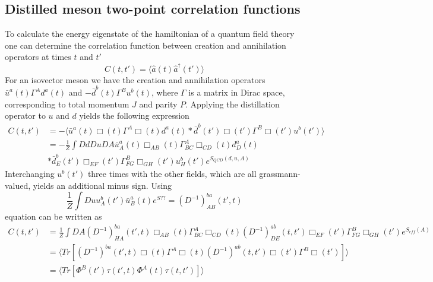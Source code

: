 \subsection{Distilled meson two-point correlation functions}
    To calculate the energy eigenstate of the hamiltonian of a quantum field theory one can determine the correlation function between creation and annihilation operators at times $t$ and $t'$
    \begin{equation}
        C(t,t') = \langle \hat{a}(t) \hat{a}^\dagger(t')\rangle
    \end{equation}
    For an isovector meson we have the creation and annihilation operators $\bar{u}^a(t)\Gamma^Ad^a(t)$ and $-\bar{d}^b(t)\Gamma^Bu^b(t)$, where $\Gamma$ is a matrix in Dirac space, corresponding to total momentum $J$ and parity $P$.
    Applying the distillation operator to $u$ and $d$ yields the following expression
    \begin{equation}\label{distillation_correlation}
        \begin{aligned}
            C(t,t') &= -\langle \bar{u}^a(t)\Box(t)\Gamma^A\Box(t)d^a(t) * \bar{d}^b(t')\Box(t')\Gamma^B\Box(t')u^b(t') \rangle\\
            &= -\frac{1}{Z}\int Dd Du DA \bar{u}_A^a(t)\Box_{AB}(t)\Gamma_{BC}^A\Box_{CD}(t)d_D^a(t)\\ &* \bar{d}_E^b(t')\Box_{EF}(t')\Gamma_{FG}^B\Box_{GH}(t')u_H^b(t') e^{S_{QCD}(d,u,A)}
        \end{aligned}
    \end{equation}
    Interchanging $u^b(t')$ three times with the other fields, which are all grassmann-valued, yields an additional minus sign. Using
    \begin{equation}
        \frac{1}{Z}\int Du u_A^b(t')\bar{u}_B^a(t)e^{S??} = (D^{-1})_{AB}^{ba}(t',t)
    \end{equation}
    equation  can be written as
    \begin{equation}
        \begin{aligned}
            C(t,t') &= \frac{1}{Z}\int DA (D^{-1})_{HA}^{ba}(t',t) \Box_{AB}(t)\Gamma_{BC}^A\Box_{CD}(t) (D^{-1})_{DE}^{ab}(t,t') \Box_{EF}(t')\Gamma_{FG}^B\Box_{GH}(t') e^{S_{eff}(A)}\\
            &= \langle Tr[(D^{-1})^{ba}(t',t) \Box(t)\Gamma^A\Box(t) (D^{-1})^{ab}(t,t') \Box(t')\Gamma^B\Box(t')] \rangle\\
            &= \langle Tr[\Phi^B(t')\tau(t',t)\Phi^A(t)\tau(t,t')] \rangle
        \end{aligned}
    \end{equation}
